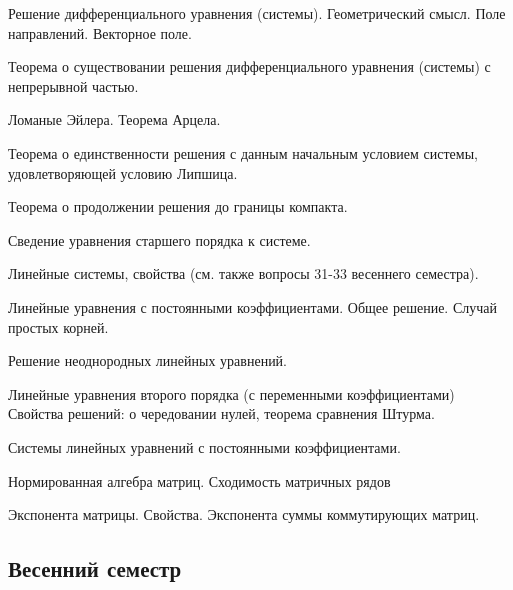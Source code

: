 \documentclass[a4paper]{article}
\begin{document}
\begin{nums}{-2}
\item
Решение дифференциального уравнения (системы). Геометрический
смысл. Поле направлений. Векторное поле.
\item
Теорема о существовании решения дифференциального уравнения
(системы) с непрерывной частью.
\item
Ломаные Эйлера. Теорема Арцела.
\item
Теорема о единственности решения с данным начальным условием
системы, удовлетворяющей условию Липшица.
\item
Теорема о продолжении решения до границы компакта.
\item
Сведение уравнения старшего порядка к системе.
\item
Линейные системы, свойства (см. также вопросы 31-33 весеннего
семестра).
\item
Линейные уравнения с постоянными коэффициентами. Общее решение.
Случай простых корней.
\item
Решение неоднородных линейных уравнений.
\item
Линейные уравнения второго порядка (с переменными коэффициентами)
Свойства решений: о чередовании нулей, теорема сравнения Штурма.
\item
Системы линейных уравнений с постоянными коэффициентами.
\item
Нормированная алгебра матриц. Сходимость матричных рядов
\item
Экспонента матрицы. Свойства. Экспонента суммы коммутирующих
матриц.
\end{nums}

\subsection{Весенний семестр}
\end{document}
